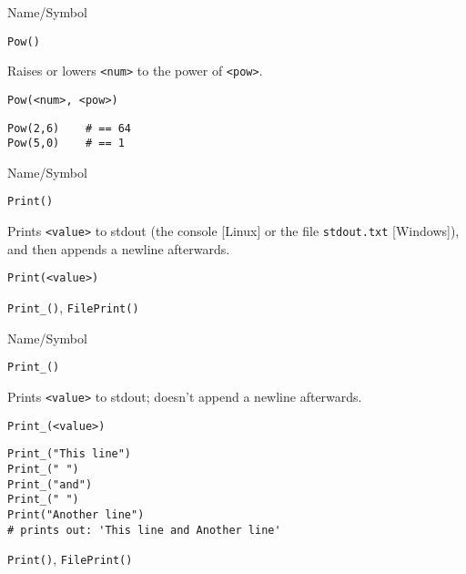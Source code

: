 \rl


\begin{desc}{Name/Symbol}
\item[Name/Symbol]	\verb+Pow()+ 

\item[Description]	Raises or lowers \verb+<num>+ to the power of \verb+<pow>+.

\item[Usage]		
\begin{verbatim}
Pow(<num>, <pow>)
\end{verbatim}

\item[Example]	
\begin{verbatim}
Pow(2,6)	# == 64
Pow(5,0)	# == 1
\end{verbatim}

\item[See Also]     
\end{desc}

\rl


\begin{desc}{Name/Symbol}
\item[Name/Symbol]	\verb+Print()+

\item[Description]	Prints \verb+<value>+ to stdout (the console [Linux] or the file \texttt{stdout.txt} [Windows]), and then appends a newline afterwards.

\item[Usage]		
\begin{verbatim}
Print(<value>)
\end{verbatim}

\item[Example]	

\item[See Also]	\verb+Print_()+, \verb+FilePrint()+
\end{desc}

\rl


\begin{desc}{Name/Symbol}
\item[Name/Symbol]	\verb+Print_()+

\item[Description]	Prints \verb+<value>+ to stdout; doesn't append a newline afterwards.

\item[Usage]		
\begin{verbatim}
Print_(<value>)
\end{verbatim}

\item[Example]	
\begin{verbatim}
Print_("This line")
Print_(" ")
Print_("and")
Print_(" ")
Print("Another line")
# prints out: 'This line and Another line'
\end{verbatim}

\item[See Also]	\verb+Print()+, \verb+FilePrint()+
\end{desc}

